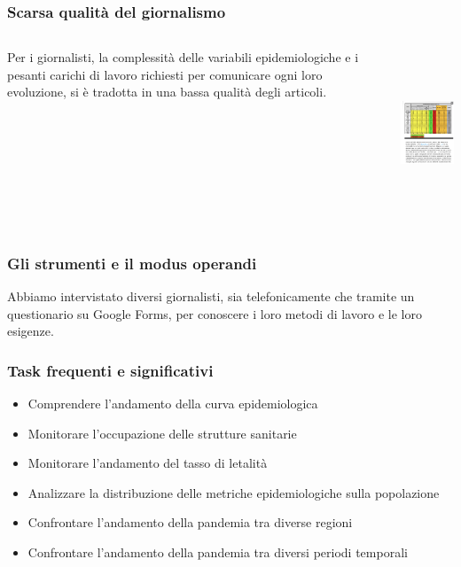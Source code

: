 \documentclass[handout]{beamer}
\begin{document}
		\begin{frame}
			\frametitle{Scarsa qualità del giornalismo}
			\begin{columns}[t]
				\begin{column}[T]{5cm}
					Per i giornalisti, la complessità delle variabili epidemiologiche e i pesanti carichi di lavoro richiesti per comunicare ogni loro evoluzione, si è tradotta in una bassa qualità degli articoli.
				\end{column}

				\begin{column}[T]{5cm}
					\includegraphics[height=5cm]{img/esempio-articolo-brutto}
				\end{column}
			\end{columns}
		\end{frame}

		\begin{frame}
			\frametitle{Gli strumenti e il modus operandi}
			Abbiamo intervistato diversi giornalisti, sia telefonicamente che tramite un questionario su Google Forms, per conoscere i loro metodi di lavoro e le loro esigenze.
		\end{frame}

		\begin{frame}
			\frametitle{Task frequenti e significativi}
			\begin{itemize}[<+->]
				\item Comprendere l'andamento della curva epidemiologica\\
				\item Monitorare l'occupazione delle strutture sanitarie\\
				\item Monitorare l'andamento del tasso di letalità\\
				\item Analizzare la distribuzione delle metriche epidemiologiche sulla popolazione\\
				\item Confrontare l'andamento della pandemia tra diverse regioni\\
				\item Confrontare l'andamento della pandemia tra diversi periodi temporali\\
			\end{itemize}
		\end{frame}
\end{document}
